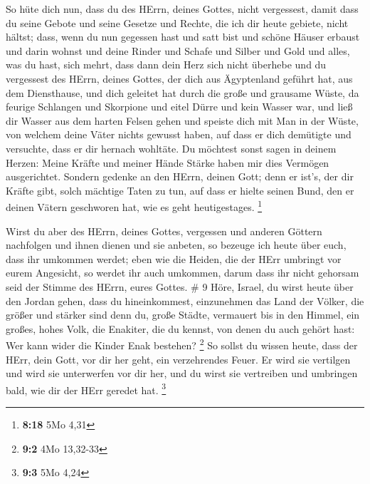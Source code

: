  So hüte dich nun, dass du des HErrn, deines Gottes, nicht
vergessest, damit dass du seine Gebote und seine Gesetze und Rechte, die
ich dir heute gebiete, nicht hältst;  dass, wenn du nun
gegessen hast und satt bist und schöne Häuser erbaust und darin wohnst
 und deine Rinder und Schafe und Silber und Gold und alles,
was du hast, sich mehrt,  dass dann dein Herz sich nicht
überhebe und du vergessest des HErrn, deines Gottes, der dich aus
Ägyptenland geführt hat, aus dem Diensthause,  und dich
geleitet hat durch die große und grausame Wüste, da feurige Schlangen
und Skorpione und eitel Dürre und kein Wasser war, und ließ dir Wasser
aus dem harten Felsen gehen  und speiste dich mit Man in
der Wüste, von welchem deine Väter nichts gewusst haben, auf dass er
dich demütigte und versuchte, dass er dir hernach wohltäte.
 Du möchtest sonst sagen in deinem Herzen: Meine Kräfte und
meiner Hände Stärke haben mir dies Vermögen ausgerichtet. 
Sondern gedenke an den HErrn, deinen Gott; denn er ist's, der dir Kräfte
gibt, solch mächtige Taten zu tun, auf dass er hielte seinen Bund, den
er deinen Vätern geschworen hat, wie es geht heutigestages. \footnote{\textbf{8:18}
  5Mo 4,31}

 Wirst du aber des HErrn, deines Gottes, vergessen und
anderen Göttern nachfolgen und ihnen dienen und sie anbeten, so bezeuge
ich heute über euch, dass ihr umkommen werdet;  eben wie
die Heiden, die der HErr umbringt vor eurem Angesicht, so werdet ihr
auch umkommen, darum dass ihr nicht gehorsam seid der Stimme des HErrn,
eures Gottes. \# 9  Höre, Israel, du wirst heute über den
Jordan gehen, dass du hineinkommest, einzunehmen das Land der Völker,
die größer und stärker sind denn du, große Städte, vermauert bis in den
Himmel,  ein großes, hohes Volk, die Enakiter, die du
kennst, von denen du auch gehört hast: Wer kann wider die Kinder Enak
bestehen? \footnote{\textbf{9:2} 4Mo 13,32-33}  So sollst du
wissen heute, dass der HErr, dein Gott, vor dir her geht, ein
verzehrendes Feuer. Er wird sie vertilgen und wird sie unterwerfen vor
dir her, und du wirst sie vertreiben und umbringen bald, wie dir der
HErr geredet hat. \footnote{\textbf{9:3} 5Mo 4,24}

